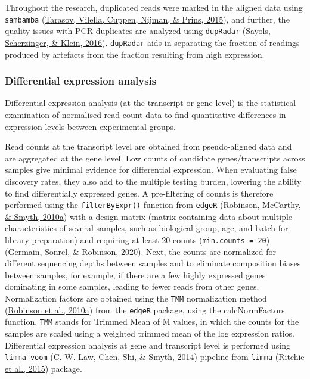 \documentclass[12pt,twoside]{reedthesis}
\begin{document}
Throughout the research, duplicated reads were marked in the aligned
data using \texttt{sambamba} (\protect\hyperlink{ref-tarasov2015}{Tarasov, Vilella, Cuppen, Nijman, \& Prins, 2015}), and further, the quality issues
with PCR duplicates are analyzed using \texttt{dupRadar} (\protect\hyperlink{ref-sayols2016}{Sayols, Scherzinger, \& Klein, 2016}).
\texttt{dupRadar} aids in separating the fraction of readings produced by
artefacts from the fraction resulting from high expression.

\hypertarget{m3.2.3}{%
\subsubsection*{Differential expression analysis}\label{m3.2.3}}

Differential expression analysis (at the transcript or gene level) is
the statistical examination of normalised read count data to find
quantitative differences in expression levels between experimental
groups.

Read counts at the transcript level are obtained from pseudo-aligned
data and are aggregated at the gene level. Low counts of candidate
genes/transcripts across samples give minimal evidence for differential
expression. When evaluating false discovery rates, they also add to the
multiple testing burden, lowering the ability to find differentially
expressed genes. A pre-filtering of counts is therefore performed using
the \texttt{filterByExpr()} function from \texttt{edgeR} (\protect\hyperlink{ref-robinson2010}{Robinson, McCarthy, \& Smyth, 2010a}) with a design
matrix (matrix containing data about multiple characteristics of several
samples, such as biological group, age, and batch for library
preparation) and requiring at least 20 counts (\texttt{min.counts\ =\ 20})
(\protect\hyperlink{ref-germain2020}{Germain, Sonrel, \& Robinson, 2020}). Next, the counts are normalized for different sequencing
depths between samples and to eliminate composition biases between
samples, for example, if there are a few highly expressed genes
dominating in some samples, leading to fewer reads from other genes.
Normalization factors are obtained using the \texttt{TMM} normalization method
(\protect\hyperlink{ref-robinson2010}{Robinson et al., 2010a}) from the \texttt{edgeR} package, using the calcNormFactors
function. \texttt{TMM} stands for Trimmed Mean of M values, in which the counts
for the samples are scaled using a weighted trimmed mean of the log
expression ratios. Differential expression analysis at gene and
transcript level is performed using \texttt{limma-voom} (\protect\hyperlink{ref-law2014}{C. W. Law, Chen, Shi, \& Smyth, 2014}) pipeline from
\texttt{limma} (\protect\hyperlink{ref-ritchie2015}{Ritchie et al., 2015}) package.
\end{document}
